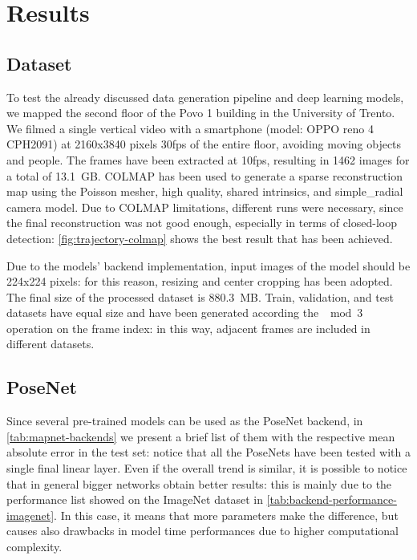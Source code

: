 \section{Results}

\subsection{Dataset}
To test the already discussed data generation pipeline and deep learning models, we mapped the second floor of the Povo 1 building in the University of Trento.
We filmed a single vertical video with a smartphone (model: OPPO reno 4 CPH2091) at 2160x3840 pixels 30fps of the entire floor, avoiding moving objects and people. The frames have been extracted at 10fps, resulting in 1462 images for a total of 13.1 GB. COLMAP has been used to generate a sparse reconstruction map using the Poisson mesher, high quality, shared intrinsics, and simple\_radial camera model.
Due to COLMAP limitations, different runs were necessary, since the final reconstruction was not good enough, especially in terms of closed-loop detection: \cref{fig:trajectory-colmap} shows the best result that has been achieved.

Due to the models' backend implementation, input images of the model should be 224x224 pixels: for this reason, resizing and center cropping has been adopted. The final size of the processed dataset is 880.3 MB. Train, validation, and test datasets have equal size and have been generated according the $\mod{3}$ operation on the frame index: in this way, adjacent frames are included in different datasets.

\subsection{PoseNet}
Since several pre-trained models can be used as the PoseNet backend, in \cref{tab:mapnet-backends} we present a brief list of them with the respective mean absolute error in the test set: notice that all the PoseNets have been tested with a single final linear layer. Even if the overall trend is similar, it is possible to notice that in general bigger networks obtain better results: this is mainly due to the performance list showed on the ImageNet dataset in \cref{tab:backend-performance-imagenet}. In this case, it means that more parameters make the difference, but causes also drawbacks in model time performances due to higher computational complexity.

